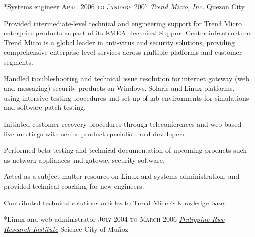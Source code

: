 \documentclass[10pt, a4paper, final]{article}
\begin{document}
\begin{section}
\begin{subsection}
\begin{compactitem}
    \end{compactitem}
  \end{subsection}
  \vspace{2.5em}

  \begin{subsection}*{Systems engineer \hfill\textsc{April 2006 to January 2007}}
    \href{http://www.trendmicro.com}{\textit{Trend Micro, Inc.}} \hfill Quezon City
    \vspace{1em}

    Provided intermediate-level technical and engineering support for Trend Micro enterprise products as part of its EMEA Technical Support Center infrastructure. Trend Micro is a global leader in anti-virus and security solutions, providing comprehensive enterprise-level services across multiple platforms and customer segments.
    \vspace{1em}
    \begin{compactitem}
      \item Handled troubleshooting and technical issue resolution for internet gateway (web and messaging) security products on Windows, Solaris and Linux platforms, using intensive testing procedures and set-up of lab environments for simulations and software patch testing.
      \item Initiated customer recovery procedures through teleconferences and web-based live meetings with senior product specialists and developers.
      \item Performed beta testing and technical documentation of upcoming products such as network appliances and gateway security software.
      \item Acted as a subject-matter resource on Linux and systems administration, and provided technical coaching for new engineers.
      \item Contributed technical solutions articles to Trend Micro's knowledge base.
      
    \end{compactitem}
  \end{subsection}
  \vspace{2.5em}

  \begin{subsection}*{Linux and web administrator \hfill\textsc{July 2004 to March 2006}}
    \href{http://www.philrice.gov.ph}{\textit{Philippine Rice Research Institute}} \hfill Science City of Mu{\~n}oz
    \vspace{1em}


\end{subsection}
\end{section}
\end{document}
